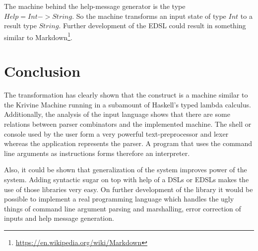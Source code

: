 \documentclass[a4paper]{article}
\begin{document}
The machine behind the help-message generator is the type $Help = Int -> String$. So the machine transforms an input state of type $Int$ to a result type $String$. Further development of the EDSL could result in something similar to Markdown\footnote{\url{https://en.wikipedia.org/wiki/Markdown}}.

\section{Conclusion}
The transformation has clearly shown that the construct is a machine similar to the Krivine Machine running in a subamount of Haskell's typed lambda calculus. Additionally, the analysis of the input language shows that there are some relations between parser combinators and the implemented machine. The shell or console used by the user form a very powerful text-preprocessor and lexer whereas the application represents the parser. A program that uses the command line arguments as instructions forms therefore an interpreter.

Also, it could be shown that generalization of the system improves power of the system. Adding syntactic sugar on top with help of a DSLs or EDSLs makes the use of those libraries very easy. On further development of the library it would be possible to implement a real programming language which handles the ugly things of command line argument parsing and marshalling, error correction of inputs and help message generation.
\end{document}
